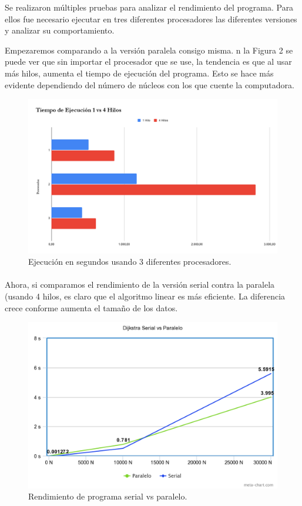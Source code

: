 \documentclass[11pt]{article}
\begin{document}
\par
Se realizaron múltiples pruebas para analizar el rendimiento del programa. Para ellos fue necesario ejecutar en tres diferentes procesadores las diferentes versiones y analizar su comportamiento. 

\par
Empezaremos comparando a la versión paralela consigo misma. n la Figura 2 se puede ver que sin importar el procesador que se use, la tendencia es que al usar más hilos, aumenta el tiempo de ejecución del programa. Esto se hace más evidente dependiendo del número de núcleos con los que cuente la computadora.  

\begin{figure}[!h]
\centering
\includegraphics[width=1\linewidth]{hil1v4.png}
  \caption{Ejecución en segundos usando 3 diferentes procesadores.}
\end{figure}

\paragraph{}
Ahora, si comparamos el rendimiento de la versión serial contra la paralela (usando 4 hilos, es claro que el algoritmo linear es más eficiente. La diferencia crece conforme aumenta el tamaño de los datos. 

\begin{figure}[!h]
\centering
\includegraphics[width=1\linewidth]{tablas.png}
  \caption{Rendimiento de programa serial vs paralelo.}
\end{figure}
\end{document}
